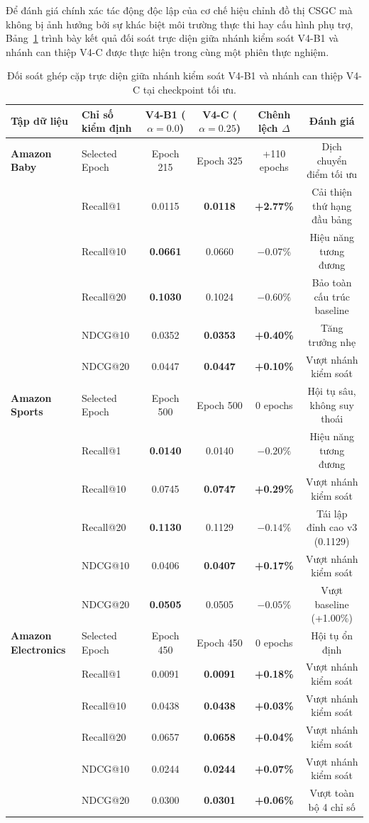 Để đánh giá chính xác tác động độc lập của cơ chế hiệu chỉnh đồ thị CSGC mà không bị ảnh hưởng bởi sự khác biệt môi trường thực thi hay cấu hình phụ trợ, Bảng~\ref{tab:stair_csgc_paired} trình bày kết quả đối soát trực diện giữa nhánh kiểm soát V4-B1 và nhánh can thiệp V4-C được thực hiện trong cùng một phiên thực nghiệm.

\begin{table}[H]
\centering
\small
\setlength{\tabcolsep}{4.5pt}
\renewcommand{\arraystretch}{1.2}
\caption{Đối soát ghép cặp trực diện giữa nhánh kiểm soát V4-B1 và nhánh can thiệp V4-C tại checkpoint tối ưu.}
\label{tab:stair_csgc_paired}
\begin{tabular}{llcccc}
\toprule
\rowcolor{gray!15}\textbf{Tập dữ liệu} & \textbf{Chỉ số kiểm định} & \textbf{V4-B1 ($\alpha=0.0$)} & \textbf{V4-C ($\alpha=0.25$)} & \textbf{Chênh lệch $\Delta$} & \textbf{Đánh giá} \\
\midrule
\textbf{Amazon Baby} & Selected Epoch & Epoch 215 & Epoch 325 & +110 epochs & Dịch chuyển điểm tối ưu \\
& Recall@1 & 0.0115 & \textbf{0.0118} & \textbf{+2.77\%} & Cải thiện thứ hạng đầu bảng \\
& Recall@10 & \textbf{0.0661} & 0.0660 & $-0.07\%$ & Hiệu năng tương đương \\
& Recall@20 & \textbf{0.1030} & 0.1024 & $-0.60\%$ & Bảo toàn cấu trúc baseline \\
& NDCG@10 & 0.0352 & \textbf{0.0353} & \textbf{+0.40\%} & Tăng trưởng nhẹ \\
& NDCG@20 & 0.0447 & \textbf{0.0447} & \textbf{+0.10\%} & Vượt nhánh kiểm soát \\
\midrule
\textbf{Amazon Sports} & Selected Epoch & Epoch 500 & Epoch 500 & 0 epochs & Hội tụ sâu, không suy thoái \\
& Recall@1 & \textbf{0.0140} & 0.0140 & $-0.20\%$ & Hiệu năng tương đương \\
& Recall@10 & 0.0745 & \textbf{0.0747} & \textbf{+0.29\%} & Vượt nhánh kiểm soát \\
& Recall@20 & \textbf{0.1130} & 0.1129 & $-0.14\%$ & Tái lập đỉnh cao v3 (0.1129) \\
& NDCG@10 & 0.0406 & \textbf{0.0407} & \textbf{+0.17\%} & Vượt nhánh kiểm soát \\
& NDCG@20 & \textbf{0.0505} & 0.0505 & $-0.05\%$ & Vượt baseline (+1.00\%) \\
\midrule
\textbf{Amazon Electronics} & Selected Epoch & Epoch 450 & Epoch 450 & 0 epochs & Hội tụ ổn định \\
& Recall@1 & 0.0091 & \textbf{0.0091} & \textbf{+0.18\%} & Vượt nhánh kiểm soát \\
& Recall@10 & 0.0438 & \textbf{0.0438} & \textbf{+0.03\%} & Vượt nhánh kiểm soát \\
& Recall@20 & 0.0657 & \textbf{0.0658} & \textbf{+0.04\%} & Vượt nhánh kiểm soát \\
& NDCG@10 & 0.0244 & \textbf{0.0244} & \textbf{+0.07\%} & Vượt nhánh kiểm soát \\
& NDCG@20 & 0.0300 & \textbf{0.0301} & \textbf{+0.06\%} & Vượt toàn bộ 4 chỉ số \\
\bottomrule
\end{tabular}
\end{table}

